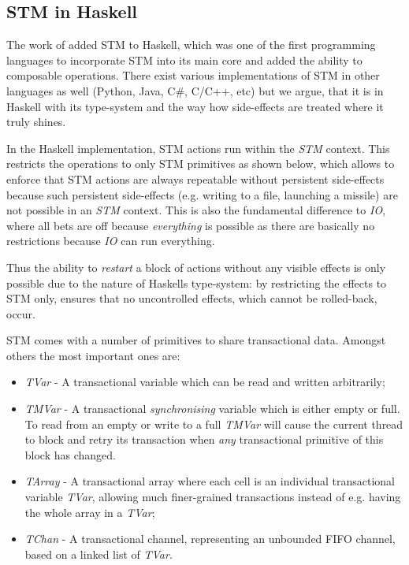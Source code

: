 \subsection{STM in Haskell}
The work of \cite{harris_composable_2005, harris_transactional_2006} added STM to Haskell, which was one of the first programming languages to incorporate STM into its main core and added the ability to composable operations. There exist various implementations of STM in other languages as well (Python, Java, C\#, C/C++, etc) but we argue, that it is in Haskell with its type-system and the way how side-effects are treated where it truly shines.

In the Haskell implementation, STM actions run within the \textit{STM} context. This restricts the operations to only STM primitives as shown below, which allows to enforce that STM actions are always repeatable without persistent side-effects because such persistent side-effects (e.g. writing to a file, launching a missile) are not possible in an \textit{STM} context. This is also the fundamental difference to  \textit{IO}, where all bets are off because \textit{everything} is possible as there are basically no restrictions because \textit{IO} can run everything.

Thus the ability to \textit{restart} a block of actions without any visible effects is only possible due to the nature of Haskells type-system: by restricting the effects to STM only, ensures that no uncontrolled effects, which cannot be rolled-back, occur.

STM comes with a number of primitives to share transactional data. Amongst others the most important ones are:

\begin{itemize}
	\item \textit{TVar} - A transactional variable which can be read and written arbitrarily;
	\item \textit{TMVar} - A transactional \textit{synchronising} variable which is either empty or full. To read from an empty or write to a full \textit{TMVar} will cause the current thread to block and retry its transaction when \textit{any} transactional primitive of this block has changed.
	\item \textit{TArray} - A transactional array where each cell is an individual transactional variable \textit{TVar}, allowing much finer-grained transactions instead of e.g. having the whole array in a \textit{TVar};
	\item \textit{TChan} - A transactional channel, representing an unbounded FIFO channel, based on a linked list of \textit{TVar}.
\end{itemize}

